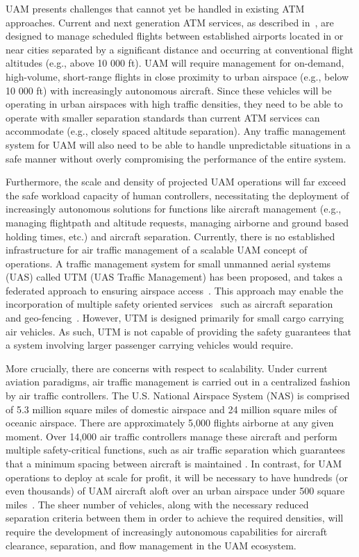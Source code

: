 UAM presents challenges that cannot yet be handled in existing ATM approaches. Current and next generation ATM services, as described in~\cite{cook2007european,swenson2006next}, are designed to manage scheduled flights between established airports located in or near cities separated by a significant distance and occurring at conventional flight altitudes (e.g., above 10 000 ft). UAM will require management for on-demand, high-volume, short-range flights in close proximity to urban airspace (e.g., below 10 000 ft) with increasingly autonomous aircraft. Since these vehicles will be operating in urban airspaces with high traffic densities, they need to be able to operate with smaller separation standards than current ATM services can accommodate (e.g., closely spaced altitude separation). Any traffic management system for UAM will also need to be able to handle unpredictable situations in a safe manner without overly compromising the performance of the entire system. 

Furthermore, the scale and density of projected UAM operations will far exceed the safe workload capacity of human controllers, necessitating the deployment of increasingly autonomous solutions for functions like aircraft management (e.g., managing flightpath and altitude requests, managing airborne and ground based holding times, etc.) and aircraft separation. Currently, there is no established infrastructure for air traffic management of a scalable UAM concept of operations.  A traffic management system for small unmanned aerial systems (UAS) called UTM (UAS Traffic Management) has been proposed, and takes a federated approach to ensuring airspace access~\cite{PRKRJJ2016}.  This approach may enable the incorporation of multiple safety oriented services~\cite{MBYDLGMC2018} such as aircraft separation~\cite{Daidalus} and geo-fencing~\cite{NCDDASC2018}.  However, UTM is designed primarily for small cargo carrying air vehicles. As such, UTM is not capable of providing the safety guarantees that a system involving larger passenger carrying vehicles would require. 

More crucially, there are concerns with respect to scalability. Under current aviation paradigms, air traffic management is carried out in a centralized fashion by air traffic controllers.  The U.S. National Airspace System (NAS) is comprised of 5.3 million square miles of domestic airspace and 24 million square miles of oceanic airspace.  There are approximately 5,000 flights airborne at any given moment.  Over 14,000 air traffic controllers manage these aircraft and perform multiple safety-critical functions, such as air traffic separation which guarantees that a minimum spacing between aircraft is maintained \cite{FAAData}.  In contrast, for UAM operations to deploy at scale for profit, it will be necessary to have hundreds (or even thousands) of UAM aircraft aloft over an urban airspace under 500 square miles~\cite{goyal2018urban}.  The sheer number of vehicles, along with the necessary reduced separation criteria between them in order to achieve the required densities, will require the development of increasingly autonomous capabilities for aircraft clearance, separation, and flow management in the UAM ecosystem.  

